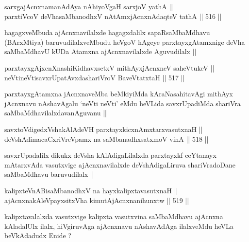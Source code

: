 \begin{shl}
sarxgajAcnxnamanAdAya nAhiyoVgaH sarxjoV yathA || \\
parxtiVcoV deVhasaMbanodhxV nA\s \s tAmxjAcnxnAdaqteV tathA ||  516 ||  
\end{shl}

\begin{artha}
hagagxveMbuda ajAcnxnavilalxde hagagxdalilx sapaRsaMbaMdhavu
(BArxMtiya) baruvudilalxveMbudu heVgoV hAgeye parxtayxgAtamxnige deVha
saMbaMdhavU kUDa Atamxna ajAcnxnavilalxde Aguvudilalx ||
\end{artha}

\begin{shl}
parxtayxgAjxcnXnashiKidhavxsetxV mithAyxjAcnxneV saheVtukeV || \\
neVtineVtisavxrUpatAvxdashariVroV BaveVtatxtaH ||  517 ||  
\end{shl}

\begin{artha}
parxtayxgAtamxna jAcnxnaveMba beMkiyiMda kAraNasahitavAgi mithAyx
jAcnxnavu nAshavAgalu `neVti neVti' eMdu heVLida savxrUpadiMda
shariVra saMbaMdhavilalxdavanAguvanu ||
\end{artha}

\begin{shl}
savxtoV\s digedxVshakAlAdeVH parxtayxkicxnAmxtarxvasutxnaH || \\
deVshAdimacaCxriVreVpamx na saMbanadhxsatxmoV vinA ||  518 ||  
\end{shl}

\begin{artha}
savxrUpadalilx dikukx deVsha kAlAdigaLilalxda parxtayxkf ceYtanayx
mAtarxvAda vasutxvige ajAcnxnavilalxde deVshAdigaLiruva shariVradoDane
saMbaMdhavu baruvudilalx ||
\end{artha}

\begin{shl}
kalipxteVnABisaMbanodhxV na hayxkalipxtavasutxnaH || \\
ajAcnxnakAleV\s payxsitxVha kimutAjAcnxnanihunxtw ||  519 ||  
\end{shl}

\begin{artha}
kalipxtavalalxda vasutxvige kalipxta vasutxvina saMbaMdhavu ajAcnxna
kAladalUlx ilalx, hiVgiruvAga ajAcnxnavu nAshavAdAga ilalxveMdu heVLa
beVkAdadudx Enide ?
\end{artha}


